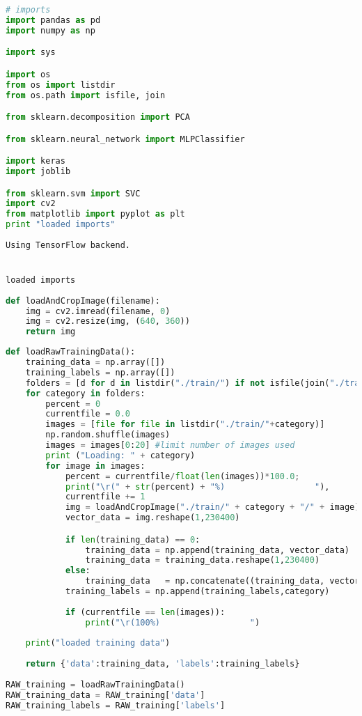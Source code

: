 \begin{lstlisting}[language=Python]
# imports
import pandas as pd
import numpy as np

import sys

import os
from os import listdir
from os.path import isfile, join

from sklearn.decomposition import PCA

from sklearn.neural_network import MLPClassifier

import keras
import joblib

from sklearn.svm import SVC
import cv2
from matplotlib import pyplot as plt
print "loaded imports"
\end{lstlisting}

\begin{lstlisting}
Using TensorFlow backend.


loaded imports
\end{lstlisting}

\begin{lstlisting}[language=Python]
def loadAndCropImage(filename):
    img = cv2.imread(filename, 0)
    img = cv2.resize(img, (640, 360)) 
    return img
\end{lstlisting}

\begin{lstlisting}[language=Python]
def loadRawTrainingData():
    training_data = np.array([])
    training_labels = np.array([])
    folders = [d for d in listdir("./train/") if not isfile(join("./train/", d)) and d not in ["cropped"]]
    for category in folders:
        percent = 0
        currentfile = 0.0
        images = [file for file in listdir("./train/"+category)]
        np.random.shuffle(images)
        images = images[0:20] #limit number of images used
        print ("Loading: " + category)
        for image in images:
            percent = currentfile/float(len(images))*100.0;
            print("\r(" + str(percent) + "%)                  "),
            currentfile += 1
            img = loadAndCropImage("./train/" + category + "/" + image)
            vector_data = img.reshape(1,230400) 

            if len(training_data) == 0:
                training_data = np.append(training_data, vector_data)
                training_data = training_data.reshape(1,230400)
            else:
                training_data   = np.concatenate((training_data, vector_data), axis=0)
            training_labels = np.append(training_labels,category)
            
            if (currentfile == len(images)):
                print("\r(100%)                  ")
                
    print("loaded training data")
                
    return {'data':training_data, 'labels':training_labels}
            
RAW_training = loadRawTrainingData()
RAW_training_data = RAW_training['data']
RAW_training_labels = RAW_training['labels']
\end{lstlisting}

